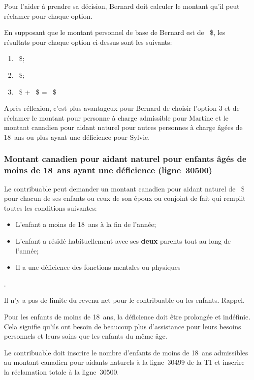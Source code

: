 Pour l'aider à prendre sa décision, Bernard doit calculer le montant qu'il peut réclamer pour chaque option.

En supposant que le montant personnel de base de Bernard est de ~\$, les résultats pour chaque option ci-dessus sont les suivants:

\begin{enumerate}
	\item {}~\$;
	\item {}~\$;
	\item {}~\$ + ~\$ =  ~\$
\end{enumerate}

Après réflexion, c'est plus avantageux pour Bernard de choisir l'option 3 et de réclamer le montant pour personne à charge admissible pour Martine et le montant canadien pour aidant naturel pour autres personnes à charge âgées de 18~ans ou plus ayant une déficience pour Sylvie.

\subsubsection{Montant canadien pour aidant naturel pour enfants âgés de moins de 18~ans ayant une déficience (ligne~30500)}
Le contribuable peut demander un montant canadien pour aidant naturel de
~\$ pour chacun de ses enfants ou ceux de son époux ou conjoint de fait qui remplit toutes les conditions suivantes:
\begin{itemize}
	\item L'enfant a moins de 18~ans à la fin de l'année;
	\item L'enfant a résidé habituellement avec ses \textbf{deux} parents tout au long de l'année;
	\item Il a une déficience des fonctions mentales ou physiques
\end{itemize}.

Il n'y a pas de limite du revenu net pour le contribuable ou les enfants.
Rappel.

\begin{rappel}
	Pour les enfants de moins de 18~ans, la déficience doit être prolongée et indéfinie. Cela signifie qu'ils ont besoin de beaucoup plus d'assistance pour leurs besoins personnels et leurs soins que les enfants du même âge.
\end{rappel}

Le contribuable doit inscrire le nombre d'enfants de moins de 18~ans admissibles au montant canadien pour aidants naturels à la ligne~30499 de la T1 et inscrire la réclamation totale à la ligne~30500.

